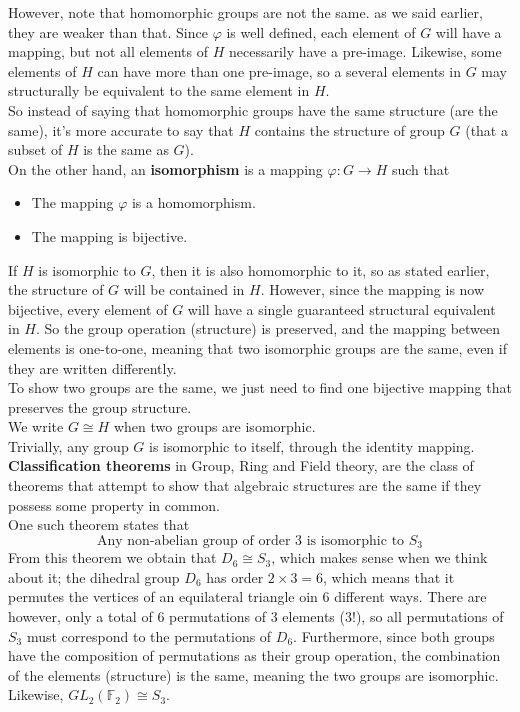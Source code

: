 \documentclass[12pt]{article}
\begin{document}
    However, note that homomorphic groups are not the same.
    as we said earlier, they are weaker than that.
    Since $\varphi$ is well defined,
    each element of $G$ will have a mapping,
    but not all elements of $H$ necessarily have a pre-image.
    Likewise, some elements of $H$ can have more than one pre-image,
    so a several elements in $G$ may structurally be equivalent
    to the same element in $H$. \\
    So instead of saying that homomorphic groups have the same structure
    (are the same),
    it's more accurate to say that
    $H$ contains the structure of group $G$
    (that a subset of $H$ is the same as $G$). \\

    On the other hand, an \textbf{isomorphism}
    is a mapping $\varphi: G \rightarrow H$ such that
    \begin{itemize}[label=$\diamond$]
        \item 
            The mapping $\varphi$ is a homomorphism.
        \item 
            The mapping is bijective.
    \end{itemize}
    If $H$ is isomorphic to $G$, then it is also homomorphic to it,
    so as stated earlier, the structure of $G$
    will be contained in $H$.
    However, since the mapping is now bijective,
    every element of $G$ will have a single guaranteed
    structural equivalent in $H$.
    So the group operation (structure) is preserved,
    and the mapping between elements is one-to-one,
    meaning that two isomorphic groups are the same,
    even if they are written differently. \\
    To show two groups are the same,
    we just need to find one bijective mapping
    that preserves the group structure. \\
    We write $G \cong H$ when two groups are isomorphic. \\

    Trivially, any group $G$ is isomorphic to itself,
    through the identity mapping. \\

    \textbf{Classification theorems} in Group, Ring and Field theory,
    are the class of theorems that attempt to show that
    algebraic structures are the same if they possess some
    property in common. \\
    One such theorem states that
    \[ \text{Any non-abelian group of order $3$ is isomorphic to $S_3$} \]
    From this theorem we obtain that $D_6 \cong S_3$,
    which makes sense when we think about it;
    the dihedral group $D_6$ has order $2 \times 3 = 6$,
    which means that it permutes the vertices of an equilateral triangle
    oin $6$ different ways.
    There are however,
    only a total of $6$ permutations of $3$ elements ($3!$),
    so all permutations of $S_3$
    must correspond to the permutations of $D_6$.
    Furthermore, since both groups have the composition of permutations
    as their group operation,
    the combination of the elements (structure) is the same,
    meaning the two groups are isomorphic. \\
    Likewise, $GL_2(\mathbb{F}_2) \cong S_3$. \\

    
    



   
\end{document}
